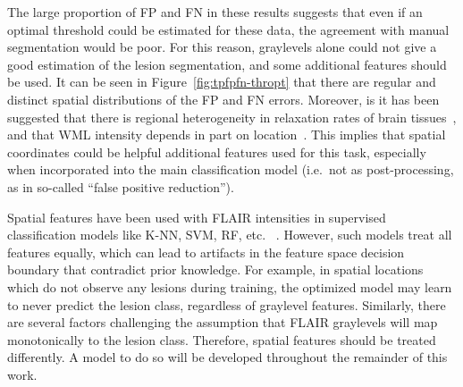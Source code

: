 \par
The large proportion of FP and FN in these results suggests that
even if an optimal threshold could be estimated for these data,
the agreement with manual segmentation would be poor.
For this reason, graylevels alone could not give a good estimation
of the lesion segmentation,
and some additional features should be used.
It can be seen in Figure~\ref{fig:tpfpfn-thropt} that there are
regular and distinct spatial distributions of the FP and FN errors.
Moreover, is it has been suggested that there is
regional heterogeneity in relaxation rates of brain tissues~\cite{Sled2004},
and that WML intensity depends in part on location~\cite{Stevenson2000,Harmouche2015}.
This implies that spatial coordinates could be helpful additional features used for this task,
especially when incorporated into the main classification model
(i.e.\ not as post-processing, as in so-called ``false positive reduction'').
\par
Spatial features have been used with FLAIR intensities
in supervised classification models like K-NN, SVM, RF, etc.%
~\cite{Anbeek2004,Anbeek2005,Dyrby2008,Griffanti2016,Dadar2017}.
However, such models treat all features equally,
which can lead to artifacts in the feature space decision boundary that contradict prior knowledge.
For example, in spatial locations which do not observe any lesions during training,
the optimized model may learn to never predict the lesion class, regardless of graylevel features.
Similarly, there are several factors challenging the assumption
that FLAIR graylevels will map monotonically to the lesion class.
Therefore, spatial features should be treated differently.
A model to do so will be developed throughout the remainder of this work.
